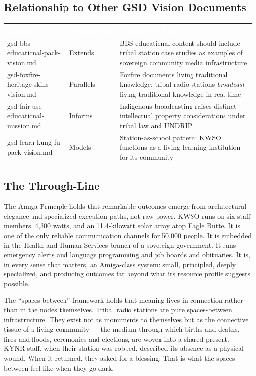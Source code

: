 \documentclass[11pt,letterpaper]{article}
\newcommand{\tableheader}[1]{\textbf{\sffamily\textcolor{white}{#1}}}
\begin{document}
\subsection{Relationship to Other GSD Vision Documents}

\begin{center}
\begin{tabularx}{\textwidth}{L{4cm}L{3cm}X}
\toprule
{}
\tableheader{Document} & \tableheader{Relationship} & \tableheader{Integration Point} \\
\midrule
gsd-bbs-educational-pack-vision.md & Extends & BBS educational content should include tribal station case studies as examples of sovereign community media infrastructure \\
gsd-foxfire-heritage-skills-vision.md & Parallels & Foxfire documents living traditional knowledge; tribal radio stations \textit{broadcast} living traditional knowledge in real time \\
gsd-fair-use-educational-mission.md & Informs & Indigenous broadcasting raises distinct intellectual property considerations under tribal law and UNDRIP \\
gsd-learn-kung-fu-pack-vision.md & Models & Station-as-school pattern: KWSO functions as a living learning institution for its community \\
\bottomrule
\end{tabularx}
\end{center}

\subsection{The Through-Line}

The Amiga Principle holds that remarkable outcomes emerge from architectural elegance and specialized execution paths, not raw power. KWSO runs on six staff members, 4,300 watts, and an 11.4-kilowatt solar array atop Eagle Butte. It is one of the only reliable communication channels for 50,000 people. It is embedded in the Health and Human Services branch of a sovereign government. It runs emergency alerts and language programming and job boards and obituaries. It is, in every sense that matters, an Amiga-class system: small, principled, deeply specialized, and producing outcomes far beyond what its resource profile suggests possible.

The ``spaces between'' framework holds that meaning lives in connection rather than in the nodes themselves. Tribal radio stations are pure spaces-between infrastructure. They exist not as monuments to themselves but as the connective tissue of a living community --- the medium through which births and deaths, fires and floods, ceremonies and elections, are woven into a shared present. KYNR staff, when their station was robbed, described its absence as a physical wound. When it returned, they asked for a blessing. That is what the spaces between feel like when they go dark.
\end{document}
